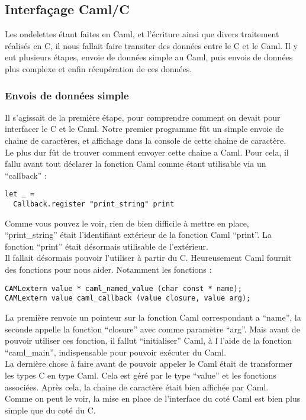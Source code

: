 \documentclass[a4paper,12pt]{article}
\begin{document}
	\subsection{Interfaçage Caml/C}
Les ondelettes  étant faites  en Caml,  et  l'écriture ainsi  que divers
traitement réalisés en  C,  il nous fallait faire  transiter des données
entre le  C et le Caml.  Il  y eut plusieurs  étapes,  envoie de données
simple  au  Caml,   puis  envois  de  données  plus  complexe  et  enfin
récupération de ces données.\\

		\subsubsection{Envois de données simple}
Il s'agissait de  la première étape,  pour comprendre  comment on devait
pour interfacer le C et le  Caml.  Notre premier programme fût un simple
envoie de chaine  de caractères,  et affichage dans la  console de cette
chaine de caractère.\\
Le plus  dur fût de trouver  comment envoyer cette  chaine a Caml.  Pour
cela,  il  fallu  avant  tout  déclarer  la  fonction  Caml  comme étant
utilisable via un ``callback'' :
\begin{verbatim}
let _ =
  Callback.register "print_string" print
\end{verbatim}
Comme vous  pouvez le voir,  rien de  bien difficile à  mettre en place,
``print\_string''  était l'identifiant  extérieur  de  la  fonction Caml
``print''.   La  fonction   ``print''  était  désormais   utilisable  de
l'extérieur.\\
Il  fallait désormais  pouvoir l'utiliser  à partir  du C.  Heureusement
Caml fournit des fonctions pour nous aider.  Notamment les fonctions :
\begin{verbatim}
CAMLextern value * caml_named_value (char const * name);
CAMLextern value caml_callback (value closure, value arg);
\end{verbatim}
La première  renvoie un  pointeur sur la  fonction Caml  correspondant a
``name'',   la  seconde  appelle  la  fonction  ``closure''  avec  comme
paramètre ``arg''.  Mais  avant  de  pouvoir  utiliser ces fonction,  il
fallut ``initialiser'' Caml,  à l  l'aide de la fonction ``caml\_main'',
indispensable pour pouvoir exécuter du Caml.\\
La dernière  chose à  faire avant de  pouvoir appeler  le Caml  était de
transformer  les types  C en  type  Caml.  Cela  est  géré  par  le type
``value''  et  les  fonctions  associées.   Après  cela,  la  chaine  de
caractère était bien affichée par Caml.\\
Comme on peut le voir,  la mise en place de l'interface du coté Caml est
bien plus simple que du coté du C.\\
\end{document}
